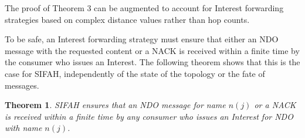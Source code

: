 \documentclass{ancs15-alternate}
\newtheorem{theorem}{Theorem}
\begin{document}
The proof of Theorem 3 can be augmented to account for Interest forwarding strategies based on complex distance values rather than hop counts.

To be safe, an Interest forwarding strategy must ensure that either an NDO message with the requested content or a NACK is received within a finite time by the consumer who issues an Interest. The following theorem shows that this is the case for SIFAH, independently of the state of the topology or the fate of messages.


\begin{theorem}
\label{theo4}
SIFAH ensures that an NDO message for name $n(j)$  or a NACK  is received within a finite time by any consumer who issues an Interest for NDO with name $n(j)$.
\end{theorem}
\end{document}
